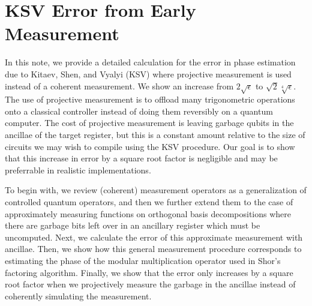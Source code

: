 \chapter{KSV Error from Early Measurement}
\label{chap:ksv-error}

In this note, we provide a detailed calculation for the error in
phase estimation due to Kitaev, Shen, and Vyalyi (KSV) where projective
measurement is used instead of a coherent measurement. We show an
increase from $2\sqrt{\epsilon}$ to $\sqrt{2}\sqrt[4]{\epsilon}$. The use
of projective measurement is to offload many trigonometric operations
onto a classical controller instead of doing them reversibly on a quantum
computer. The cost of projective measurement is leaving garbage qubits in
the ancillae of the target register, but this is a constant amount relative to
the size of circuits we may wish to compile using the KSV procedure.
Our goal is to show that this increase in error by a square root
factor is negligible and may be preferrable in realistic implementations.

To begin with, we review (coherent) measurement operators as a generalization of
controlled quantum operators, and then we further extend them to the case
of approximately measuring functions on orthogonal basis decompositions
where there are garbage bits left over in an ancillary register which must
be uncomputed.
Next, we calculate the error of this approximate measurement with ancillae.
Then, we show how this general measurement procedure corresponds to
estimating the phase of the modular multiplication operator used in
Shor's factoring algorithm. Finally, we show that the error only
increases by a square root factor when we projectively measure the garbage
in the ancillae instead of coherently simulating the measurement.






